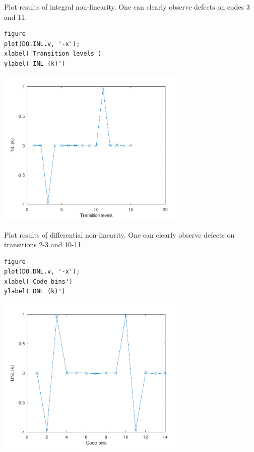 Plot results of integral non-linearity. One can clearly observe defects on codes 3 and
11.

\begin{lstlisting}
figure
plot(DO.INL.v, '-x');
xlabel('Transition levels')
ylabel('INL (k)')
\end{lstlisting}
\begin{center}
\includegraphics[width=0.7\textwidth]{algs_examples_published/INL-DNL_alg_example-2.pdf}
\end{center}


Plot results of differential non-linearity. One can clearly observe defects on transitions 2-3 and
10-11.

\begin{lstlisting}
figure
plot(DO.DNL.v, '-x');
xlabel('Code bins')
ylabel('DNL (k)')
\end{lstlisting}
\begin{center}
\includegraphics[width=0.7\textwidth]{algs_examples_published/INL-DNL_alg_example-3.pdf}
\end{center}


\stopcontents[localtoc]
